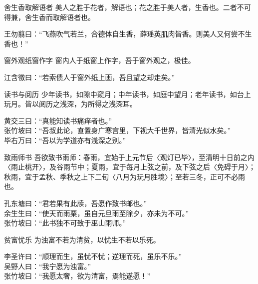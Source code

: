 \begin{yulu}{舍生香取解语者}
美人之胜于花者，解语也；花之胜于美人者，生香也。二者不可得兼，舍生香而取解语者也。
\begin{comments}
王勿翦曰：“飞燕吹气若兰，合德体自生香，薛瑶英肌肉皆香。则美人又何尝不生香也！”
\end{comments}
\end{yulu}

\begin{yulu}{窗外观纸窗作字}
窗内人于纸窗上作字，吾于窗外观之，极佳。
\begin{comments}
江含徵曰：“若索债人于窗外纸上画，吾且望之却走矣。”
\end{comments}
\end{yulu}

\begin{yulu}{读书与阅历}
少年读书，如隙中窥月；中年读书，如庭中望月；老年读书，如台上玩月。皆以阅历之浅深，为所得之浅深耳。
\begin{comments}
黄交三曰：“真能知读书痛痒者也。” \\
张竹坡曰：“吾叔此论，直置身广寒宫里，下视大千世界，皆清光似水矣。” \\
毕右万曰：“吾以为学道亦有浅深之别。”
\end{comments}
\end{yulu}

\begin{yulu}{致雨师书}
吾欲致书雨师：春雨，宜始于上元节后〈观灯已毕〉，至清明十日前之内〈雨止桃开〉，及谷雨节中；夏雨，宜于每月上弦之前，及下弦之后〈免碍于月〉；秋雨，宜于孟秋、季秋之上下二旬〈八月为玩月胜境〉；至若三冬，正可不必雨也。
\begin{comments}
孔东塘曰：“君若果有此牍，吾愿作致书邮也。” \\
余生生曰：“使天而雨粟，虽自元旦雨至除夕，亦未为不可。” \\
张竹坡曰：“此书独不可致于巫山雨师。”
\end{comments}
\end{yulu}

\begin{yulu}{贫富忧乐}
为浊富不若为清贫，以忧生不若以乐死。
\begin{comments}
李圣许曰：“顺理而生，虽忧不忧；逆理而死，虽乐不乐。” \\
吴野人曰：“我宁愿为浊富。” \\
张竹坡曰：“我愿太奢，欲为清富，焉能遂愿！”
\end{comments}
\end{yulu}

